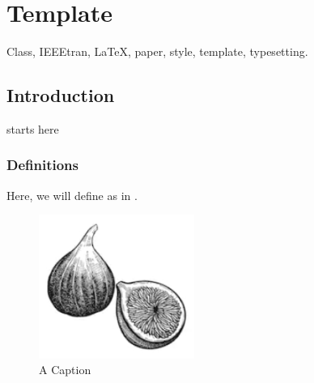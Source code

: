 \chapter{Template}

\begin{abstract}
This document describes the most common article elements and how to use the IEEEtran class with \LaTeX \ to produce files that are suitable for submission to the Institute of Electrical and Electronics Engineers (IEEE).  IEEEtran can produce conference, journal and technical note (correspondence) papers with a suitable choice of class options.
\end{abstract}

\begin{IEEEkeywords}
Class, IEEEtran, \LaTeX, paper, style, template, typesetting.
\end{IEEEkeywords}


\section{Introduction}
 starts here

\subsection{Definitions}
Here, we will define \cite{FrictionPreferredGrasp} as in .
\begin{figure}[h]
    \centering
    \includegraphics[width=2in]{Figs/fig1}
    \caption{A Caption}
    \label{fig:1}
\end{figure}

